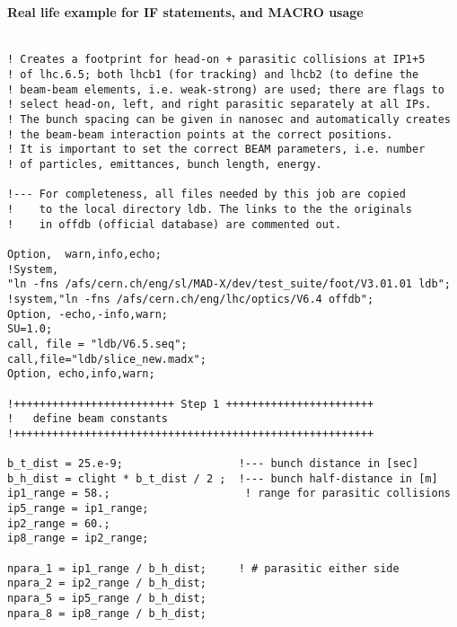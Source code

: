 




\paragraph{Real life example for IF statements, and MACRO usage}


\begin{verbatim}

! Creates a footprint for head-on + parasitic collisions at IP1+5 
! of lhc.6.5; both lhcb1 (for tracking) and lhcb2 (to define the
! beam-beam elements, i.e. weak-strong) are used; there are flags to
! select head-on, left, and right parasitic separately at all IPs.
! The bunch spacing can be given in nanosec and automatically creates
! the beam-beam interaction points at the correct positions.
! It is important to set the correct BEAM parameters, i.e. number
! of particles, emittances, bunch length, energy.

!--- For completeness, all files needed by this job are copied
!    to the local directory ldb. The links to the the originals
!    in offdb (official database) are commented out.

Option,  warn,info,echo;
!System,
"ln -fns /afs/cern.ch/eng/sl/MAD-X/dev/test_suite/foot/V3.01.01 ldb";
!system,"ln -fns /afs/cern.ch/eng/lhc/optics/V6.4 offdb";
Option, -echo,-info,warn;
SU=1.0;
call, file = "ldb/V6.5.seq";
call,file="ldb/slice_new.madx";
Option, echo,info,warn;

!+++++++++++++++++++++++++ Step 1 +++++++++++++++++++++++
! 	define beam constants
!++++++++++++++++++++++++++++++++++++++++++++++++++++++++

b_t_dist = 25.e-9;                  !--- bunch distance in [sec]
b_h_dist = clight * b_t_dist / 2 ;  !--- bunch half-distance in [m]
ip1_range = 58.;                     ! range for parasitic collisions
ip5_range = ip1_range;
ip2_range = 60.;
ip8_range = ip2_range;

npara_1 = ip1_range / b_h_dist;     ! # parasitic either side
npara_2 = ip2_range / b_h_dist;
npara_5 = ip5_range / b_h_dist;
npara_8 = ip8_range / b_h_dist;


\end{verbatim}
